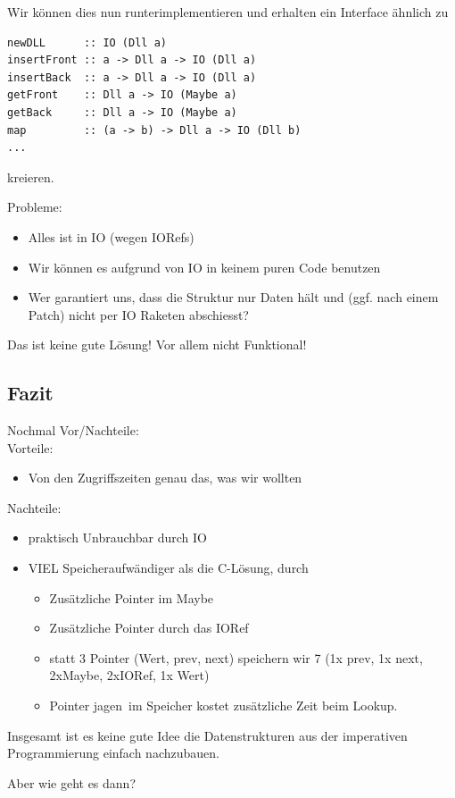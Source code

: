 \documentclass{beamer}
\begin{document}
\begin{frame}[fragile]
Wir können dies nun runterimplementieren und erhalten ein Interface ähnlich zu
\begin{verbatim}
newDLL      :: IO (Dll a)
insertFront :: a -> Dll a -> IO (Dll a)
insertBack  :: a -> Dll a -> IO (Dll a)
getFront    :: Dll a -> IO (Maybe a)
getBack     :: Dll a -> IO (Maybe a)
map         :: (a -> b) -> Dll a -> IO (Dll b)
...
\end{verbatim}
kreieren.\\\par\pause
Probleme:
\begin{itemize}
 \item Alles ist in IO (wegen IORefs)
 \pause
 \item Wir können es aufgrund von IO in keinem puren Code benutzen
 \pause
 \item Wer garantiert uns, dass die Struktur nur Daten hält und (ggf. nach einem \glqq Patch\grqq ) nicht per IO Raketen abschiesst?
\end{itemize}
\pause
Das ist keine gute Lösung! Vor allem nicht Funktional!
\end{frame}

\subsection{Fazit}

\begin{frame}
Nochmal Vor/Nachteile:\\\pause
Vorteile:
\begin{itemize}
 \item Von den Zugriffszeiten genau das, was wir wollten
\end{itemize}
\pause
Nachteile:
\begin{itemize}
 \item praktisch Unbrauchbar durch IO
 \pause
 \item VIEL Speicheraufwändiger als die C-Lösung, durch
 \pause
 \begin{itemize}
  \item Zusätzliche Pointer im Maybe
  \pause
  \item Zusätzliche Pointer durch das IORef
  \pause
  \item statt 3 Pointer (Wert, prev, next) speichern wir 7 (1x prev, 1x next, 2xMaybe, 2xIORef, 1x Wert)
  \pause
  \item \glqq Pointer jagen\grqq \ im Speicher kostet zusätzliche Zeit beim Lookup.
 \end{itemize}
\end{itemize}
\pause
Insgesamt ist es keine gute Idee die Datenstrukturen aus der imperativen Programmierung einfach nachzubauen. \\\par\pause
Aber wie geht es dann?
\end{frame}
\end{document}
